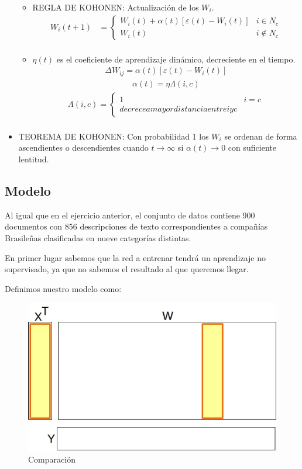 \begin{itemize}
\begin{itemize}
			\item REGLA DE KOHONEN: Actualización de los $W_{i}$.
					\begin{align*}
					 W_{i}(t+1) &=  \begin{cases}
										W_{i}(t) + \alpha(t) [ \varepsilon(t) - W_{i}(t) ] & i \in N_{c} \\
										W_{i}(t)                                           & i \not \in N_{c}  
									\end{cases} \\
					\end{align*}
			\item $\eta(t)$ es el coeficiente de aprendizaje dinámico, decreciente en el tiempo.
				\begin{align*}
					\Delta W_{ij} = \alpha(t) [ \varepsilon(t) - W_{i}(t) ]
				\end{align*}
				\begin{align*}
					\alpha(t) = \eta \Lambda(i,c)
				\end{align*}
				\begin{align*}
					\Lambda(i,c) = \begin{cases}
										1 & i = c \\
										decrece a mayor distancia entre i y c 
									\end{cases} \\
				\end{align*}
		\end{itemize}
	\item TEOREMA DE KOHONEN: Con probabilidad 1 los $W_{i}$ se ordenan de forma ascendientes o descendientes cuando $t \to
		\infty$ si $\alpha(t) \to 0$ con suficiente lentitud.
\end{itemize}

\subsection{Modelo}
Al igual que en el ejercicio anterior, el conjunto de datos contiene 900 documentos con 856 descripciones de texto correspondientes a compañías Brasileñas clasificadas en nueve categorías distintas.

En primer lugar sabemos que la red a entrenar tendrá un aprendizaje no supervisado, ya que no sabemos el resultado al que queremos llegar.

Definimos nuestro modelo como:

\begin{figure}[ht!]
	\centering
	\includegraphics[width=0.7\linewidth]{img/parte2-comparacion.jpg}
	\caption{Comparación}
	\label{comparacion}
\end{figure}

